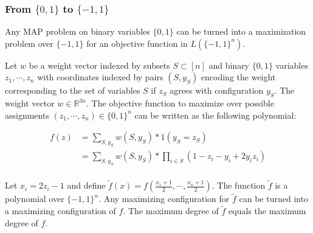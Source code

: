 \subsubsection{ From $\{0,1\}$ to $\{-1,1\}$ }

Any MAP problem on binary variables $\{0,1\}$ can be turned into a maximization problem over $\{-1,1\}$ for an objective function in $L(\{-1,1\}^n)$.

Let $w$ be a weight vector indexed by subsets $S \subset [n]$ and binary $\{0,1\}$ variables $z_1, \cdots, z_n$ with coordinates indexed by pairs $(S,y_S)$ encoding the weight corresponding to the set of variables $S$ if $z_S$ agrees with configuration $y_S$. The weight vector $w \in \mathbb{R}^{3n}$. The objective function to maximize over possible assignments $(z_1, \cdots, z_n) \in \{0,1\}^n$ can be written as the following polynomial:

\begin{align*}
f(z) &= \sum_{S,y_S} w(S,y_S)*1(y_S = z_S)\\
    &= \sum_{S,y_S} w(S,y_S)* \prod_{i \in S} (1- z_i -y_i + 2y_iz_i) \\
\end{align*}

Let $x_i = 2z_i - 1$ and define $\tilde{f}(x) = f\left(\frac{x_1+1}{2}, \cdots, \frac{x_n+1}{2}\right)$. The function $\tilde{f}$ is a polynomial over $\{-1,1\}^n$. Any maximizing configuration for $\tilde{f}$ can be turned into a maximizing configuration of $f$. The maximum degree of $\tilde{f}$ equals the maximum degree of $f$.
